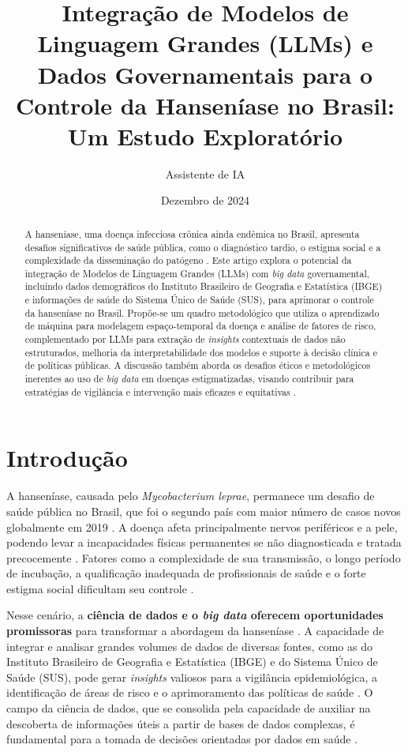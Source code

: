 \documentclass{article}
\title{Integração de Modelos de Linguagem Grandes (LLMs) e Dados Governamentais para o Controle da Hanseníase no Brasil: Um Estudo Exploratório}
\author{Assistente de IA} %
\date{Dezembro de 2024}
\begin{document}
\maketitle

\begin{abstract}
A hanseníase, uma doença infecciosa crônica ainda endêmica no Brasil, apresenta desafios significativos de saúde pública, como o diagnóstico tardio, o estigma social e a complexidade da disseminação do patógeno \cite{brasil2017guia, brasil2022pcdt, inovacao_computacional_hanseniase}. Este artigo explora o potencial da integração de Modelos de Linguagem Grandes (LLMs) com \textit{big data} governamental, incluindo dados demográficos do Instituto Brasileiro de Geografia e Estatística (IBGE) e informações de saúde do Sistema Único de Saúde (SUS), para aprimorar o controle da hanseníase no Brasil. Propõe-se um quadro metodológico que utiliza o aprendizado de máquina para modelagem espaço-temporal da doença e análise de fatores de risco, complementado por LLMs para extração de \textit{insights} contextuais de dados não estruturados, melhoria da interpretabilidade dos modelos e suporte à decisão clínica e de políticas públicas. A discussão também aborda os desafios éticos e metodológicos inerentes ao uso de \textit{big data} em doenças estigmatizadas, visando contribuir para estratégias de vigilância e intervenção mais eficazes e equitativas \cite{inovacao_computacional_hanseniase, saldanha2021ciencia, brasil2022pcdt}.
\end{abstract}

\section{Introdução}
A hanseníase, causada pelo \textit{Mycobacterium leprae}, permanece um desafio de saúde pública no Brasil, que foi o segundo país com maior número de casos novos globalmente em 2019 \cite{brasil2022pcdt}. A doença afeta principalmente nervos periféricos e a pele, podendo levar a incapacidades físicas permanentes se não diagnosticada e tratada precocemente \cite{brasil2017guia, brasil2022pcdt}. Fatores como a complexidade de sua transmissão, o longo período de incubação, a qualificação inadequada de profissionais de saúde e o forte estigma social dificultam seu controle \cite{brasil2017guia, brasil2022pcdt}.

Nesse cenário, a \textbf{ciência de dados e o \textit{big data} oferecem oportunidades promissoras} para transformar a abordagem da hanseníase \cite{saldanha2021ciencia, inovacao_computacional_hanseniase}. A capacidade de integrar e analisar grandes volumes de dados de diversas fontes, como as do Instituto Brasileiro de Geografia e Estatística (IBGE) e do Sistema Único de Saúde (SUS), pode gerar \textit{insights} valiosos para a vigilância epidemiológica, a identificação de áreas de risco e o aprimoramento das políticas de saúde \cite{saldanha2021ciencia}. O campo da ciência de dados, que se consolida pela capacidade de auxiliar na descoberta de informações úteis a partir de bases de dados complexas, é fundamental para a tomada de decisões orientadas por dados em saúde \cite{saldanha2021ciencia}.
\end{document}
